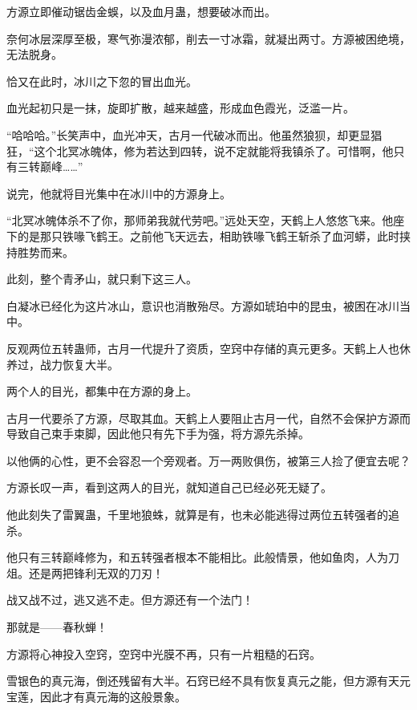 
\begin{this_body}



方源立即催动锯齿金蜈，以及血月蛊，想要破冰而出。

奈何冰层深厚至极，寒气弥漫浓郁，削去一寸冰霜，就凝出两寸。方源被困绝境，无法脱身。

恰又在此时，冰川之下忽的冒出血光。

血光起初只是一抹，旋即扩散，越来越盛，形成血色霞光，泛滥一片。

“哈哈哈。”长笑声中，血光冲天，古月一代破冰而出。他虽然狼狈，却更显猖狂，“这个北冥冰魄体，修为若达到四转，说不定就能将我镇杀了。可惜啊，他只有三转巅峰……”

说完，他就将目光集中在冰川中的方源身上。

“北冥冰魄体杀不了你，那师弟我就代劳吧。”远处天空，天鹤上人悠悠飞来。他座下的是那只铁喙飞鹤王。之前他飞天远去，相助铁喙飞鹤王斩杀了血河蟒，此时挟持胜势而来。

此刻，整个青矛山，就只剩下这三人。

白凝冰已经化为这片冰山，意识也消散殆尽。方源如琥珀中的昆虫，被困在冰川当中。

反观两位五转蛊师，古月一代提升了资质，空窍中存储的真元更多。天鹤上人也休养过，战力恢复大半。

两个人的目光，都集中在方源的身上。

古月一代要杀了方源，尽取其血。天鹤上人要阻止古月一代，自然不会保护方源而导致自己束手束脚，因此他只有先下手为强，将方源先杀掉。

以他俩的心性，更不会容忍一个旁观者。万一两败俱伤，被第三人捡了便宜去呢？

方源长叹一声，看到这两人的目光，就知道自己已经必死无疑了。

他此刻失了雷翼蛊，千里地狼蛛，就算是有，也未必能逃得过两位五转强者的追杀。

他只有三转巅峰修为，和五转强者根本不能相比。此般情景，他如鱼肉，人为刀俎。还是两把锋利无双的刀刃！

战又战不过，逃又逃不走。但方源还有一个法门！

那就是——春秋蝉！

方源将心神投入空窍，空窍中光膜不再，只有一片粗糙的石窍。

雪银色的真元海，倒还残留有大半。石窍已经不具有恢复真元之能，但方源有天元宝莲，因此才有真元海的这般景象。


\end{this_body}
